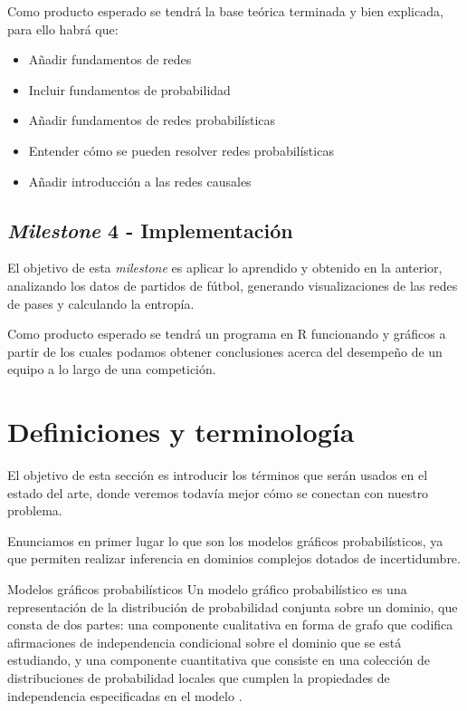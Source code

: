 Como producto esperado se tendrá la base teórica terminada y bien explicada, para ello habrá que: 

\begin{itemize}
    \item Añadir fundamentos de redes
    \item Incluir fundamentos de probabilidad 
    \item Añadir fundamentos de redes probabilísticas 
    \item Entender cómo se pueden resolver redes probabilísticas 
    \item Añadir introducción a las redes causales 
\end{itemize}

\subsection{\textit{Milestone} 4 - Implementación} 
El objetivo de esta \textit{milestone} es aplicar lo aprendido y obtenido en la anterior, 
analizando los datos de partidos de fútbol, generando visualizaciones de las redes de pases y 
calculando la entropía.

Como producto esperado se tendrá un programa en R funcionando y gráficos a partir de los cuales 
podamos obtener conclusiones acerca del desempeño de un equipo a lo largo de una competición.

\section{Definiciones y terminología}
El objetivo de esta sección es introducir los términos que serán usados en el estado del arte, donde veremos 
todavía mejor cómo se conectan con nuestro problema.

Enunciamos en primer lugar lo que son los modelos gráficos probabilísticos, ya que permiten realizar 
inferencia en dominios complejos dotados de incertidumbre.

\begin{definicion}{Modelos gráficos probabilísticos} \label{subsect:modelos}
Un modelo gráfico probabilístico es una representación de la distribución de probabilidad conjunta 
sobre un dominio, que consta de dos partes: una componente cualitativa
en forma de grafo que codifica afirmaciones de independencia condicional sobre el 
dominio que se está estudiando, y una componente cuantitativa que consiste en una colección de 
distribuciones de probabilidad locales que cumplen la propiedades de independencia especificadas 
en el modelo \cite{inference-rev-hbn}. 
\end{definicion}

